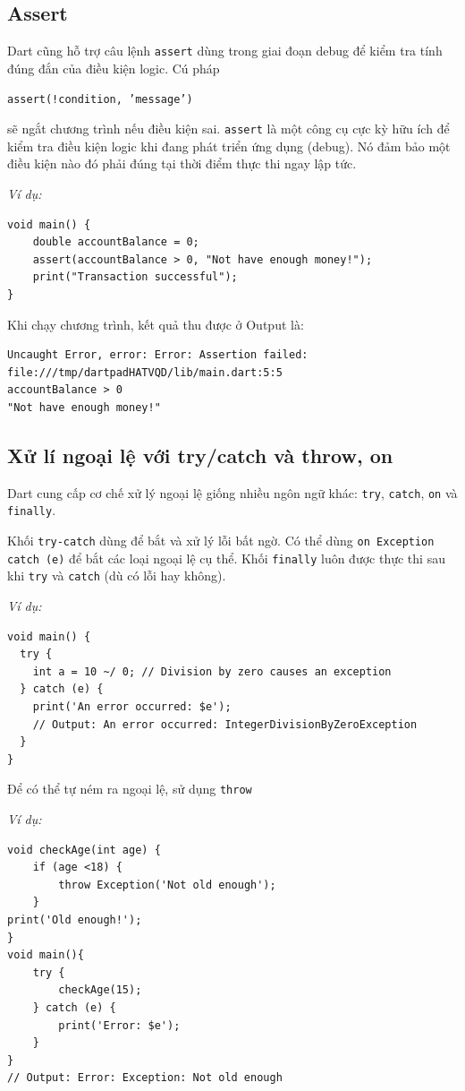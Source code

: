\documentclass[../DoAn.tex]{subfiles}
\numberwithin{figure}{chapter}
\begin{document}
\subsection{Assert} 
Dart cũng hỗ trợ câu lệnh \texttt{assert} dùng trong giai đoạn debug để kiểm tra tính đúng đắn của điều kiện logic. Cú pháp

    \texttt{assert(!condition, 'message')} 
    
sẽ ngắt chương trình nếu điều kiện sai. 
\texttt{assert} là một công cụ cực kỳ hữu ích để kiểm tra điều kiện
logic khi đang phát triển ứng dụng (debug). Nó đảm bảo một điều kiện nào đó phải đúng tại thời điểm thực thi ngay lập tức. 

\textit{Ví dụ:}
\begin{lstlisting}
void main() {
    double accountBalance = 0;
    assert(accountBalance > 0, "Not have enough money!");
    print("Transaction successful");
}
\end{lstlisting}

Khi chạy chương trình, kết quả thu được ở Output là:
\begin{lstlisting}
Uncaught Error, error: Error: Assertion failed: 
file:///tmp/dartpadHATVQD/lib/main.dart:5:5
accountBalance > 0
"Not have enough money!"  
\end{lstlisting}  

\subsection{Xử lí ngoại lệ với try/catch và throw, on}

Dart cung cấp cơ chế xử lý ngoại lệ giống nhiều ngôn ngữ khác: \texttt{try}, \texttt{catch}, \texttt{on} và \texttt{finally}. 

Khối \texttt{try-catch} dùng để bắt và xử lý lỗi bất ngờ. Có thể dùng \texttt{on Exception catch (e)} để bắt các loại ngoại lệ cụ thể. Khối \texttt{finally} luôn được thực thi sau khi \texttt{try} và \texttt{catch} (dù có lỗi hay không). 

\textit{Ví dụ:}
\begin{lstlisting}
void main() {
  try {
    int a = 10 ~/ 0; // Division by zero causes an exception
  } catch (e) {
    print('An error occurred: $e');
    // Output: An error occurred: IntegerDivisionByZeroException
  }
}
\end{lstlisting}

Để có thể tự ném ra ngoại lệ, sử dụng \texttt{throw} 

\textit{Ví dụ:}
\begin{lstlisting}
void checkAge(int age) {
    if (age <18) {
        throw Exception('Not old enough');
    }
print('Old enough!');
}
void main(){
    try {
        checkAge(15);
    } catch (e) {
        print('Error: $e');
    }
}
// Output: Error: Exception: Not old enough
\end{lstlisting}
\end{document}

